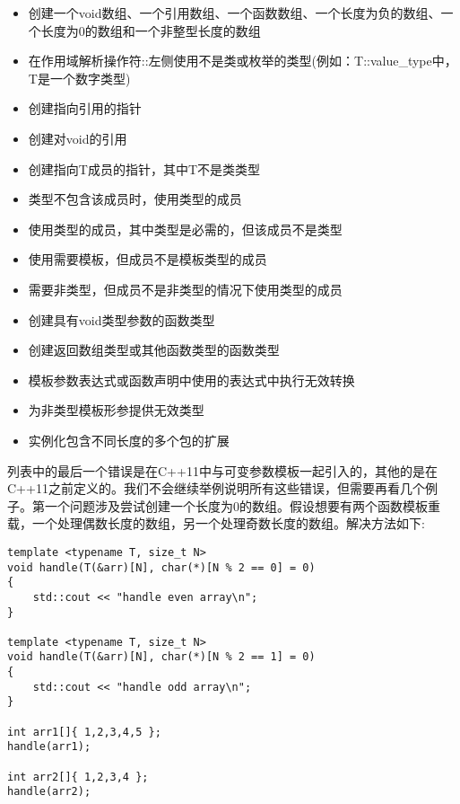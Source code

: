 \begin{itemize}
\item
创建一个void数组、一个引用数组、一个函数数组、一个长度为负的数组、一个长度为0的数组和一个非整型长度的数组

\item
在作用域解析操作符::左侧使用不是类或枚举的类型(例如：T::value\_type中，T是一个数字类型)

\item
创建指向引用的指针

\item
创建对void的引用

\item
创建指向T成员的指针，其中T不是类类型

\item
类型不包含该成员时，使用类型的成员

\item
使用类型的成员，其中类型是必需的，但该成员不是类型

\item
使用需要模板，但成员不是模板类型的成员

\item
需要非类型，但成员不是非类型的情况下使用类型的成员

\item
创建具有void类型参数的函数类型

\item
创建返回数组类型或其他函数类型的函数类型

\item
模板参数表达式或函数声明中使用的表达式中执行无效转换

\item
为非类型模板形参提供无效类型

\item
实例化包含不同长度的多个包的扩展
\end{itemize}

列表中的最后一个错误是在C++11中与可变参数模板一起引入的，其他的是在C++11之前定义的。我们不会继续举例说明所有这些错误，但需要再看几个例子。第一个问题涉及尝试创建一个长度为0的数组。假设想要有两个函数模板重载，一个处理偶数长度的数组，另一个处理奇数长度的数组。解决方法如下:

\begin{lstlisting}[style=styleCXX]
template <typename T, size_t N>
void handle(T(&arr)[N], char(*)[N % 2 == 0] = 0)
{
	std::cout << "handle even array\n";
}

template <typename T, size_t N>
void handle(T(&arr)[N], char(*)[N % 2 == 1] = 0)
{
	std::cout << "handle odd array\n";
}

int arr1[]{ 1,2,3,4,5 };
handle(arr1);

int arr2[]{ 1,2,3,4 };
handle(arr2);
\end{lstlisting}

